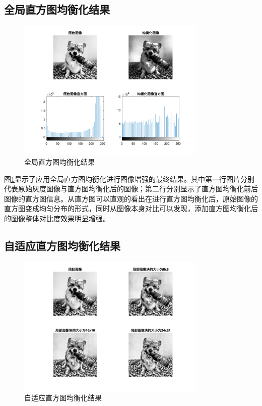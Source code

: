 \documentclass[conference]{IEEEtran}
\begin{document}
\subsection{全局直方图均衡化结果}
\begin{figure}[htbp]
	\centerline{
		\includegraphics[width=9cm]{q1_1.png} 	
	}
	\caption{全局直方图均衡化结果}
	\label{pic1}
\end{figure}

图\ref{pic1}显示了应用全局直方图均衡化\cite{b1}进行图像增强的最终结果。其中第一行图片分别代表原始灰度图像与直方图均衡化后的图像；第二行分别显示了直方图均衡化前后图像的直方图信息。从直方图可以直观的看出在进行直方图均衡化后，原始图像的直方图变成均匀分布的形式，同时从图像本身对比可以发现，添加直方图均衡化后的图像整体对比度效果明显增强。

\subsection{自适应直方图均衡化结果}
\begin{figure}[htbp]
	\centerline{
		\includegraphics[width=9cm]{q1_2.png} 	
	}
	\caption{自适应直方图均衡化结果}
	\label{pic2}
\end{figure}
\end{document}
